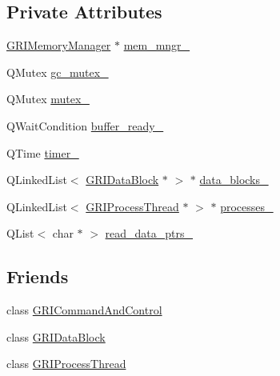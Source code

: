 \subsection*{\-Private \-Attributes}
\begin{DoxyCompactItemize}
\item 
\hyperlink{classGRIMemoryManager}{\-G\-R\-I\-Memory\-Manager} $\ast$ \hyperlink{classGRIRegulator_a9d6026fe67539022cad0e9bb4be60956}{mem\-\_\-mngr\-\_\-}
\item 
\-Q\-Mutex \hyperlink{classGRIRegulator_a3b75f15bdae72cbf888084d6e396c8b2}{gc\-\_\-mutex\-\_\-}
\item 
\-Q\-Mutex \hyperlink{classGRIRegulator_a462abd0c2e6a432f9d080cde8899d059}{mutex\-\_\-}
\item 
\-Q\-Wait\-Condition \hyperlink{classGRIRegulator_ae0fe8063d2012c33caa9f09ee8b078c9}{buffer\-\_\-ready\-\_\-}
\item 
\-Q\-Time \hyperlink{classGRIRegulator_a43ec993acb8324946780eeab8484e8b4}{timer\-\_\-}
\item 
\-Q\-Linked\-List$<$ \hyperlink{classGRIDataBlock}{\-G\-R\-I\-Data\-Block} $\ast$ $>$ $\ast$ \hyperlink{classGRIRegulator_af68ee4d44730f3b5fd07df9ada967ce2}{data\-\_\-blocks\-\_\-}
\item 
\-Q\-Linked\-List$<$ \hyperlink{classGRIProcessThread}{\-G\-R\-I\-Process\-Thread} $\ast$ $>$ $\ast$ \hyperlink{classGRIRegulator_afbe971d9b6ae796fd8fe9bc8f241ba35}{processes\-\_\-}
\item 
\-Q\-List$<$ char $\ast$ $>$ \hyperlink{classGRIRegulator_acbc03d3e5b17ea2725ac93b313ecb4e3}{read\-\_\-data\-\_\-ptrs\-\_\-}
\end{DoxyCompactItemize}
\subsection*{\-Friends}
\begin{DoxyCompactItemize}
\item 
class \hyperlink{classGRIRegulator_ae5d9162c1cf3d4e10a949c025ad576d7}{\-G\-R\-I\-Command\-And\-Control}
\item 
class \hyperlink{classGRIRegulator_a02a3c0a1755a1c589621c9f0f0f871f1}{\-G\-R\-I\-Data\-Block}
\item 
class \hyperlink{classGRIRegulator_a5daf6c2b25042fa24a9190cd0430a008}{\-G\-R\-I\-Process\-Thread}
\end{DoxyCompactItemize}


